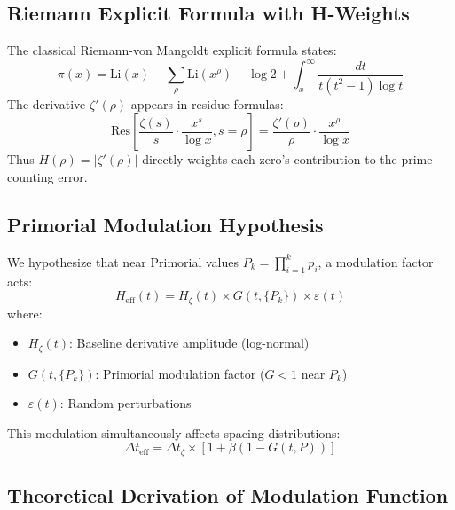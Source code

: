 \documentclass[12pt]{article}
\begin{document}
\subsection{Riemann Explicit Formula with H-Weights}

The classical Riemann-von Mangoldt explicit formula states:
%
\begin{equation}
\pi(x) = \text{Li}(x) - \sum_{\rho} \text{Li}(x^{\rho}) - \log 2 + \int_x^{\infty} \frac{dt}{t(t^2-1)\log t}
\end{equation}
%
The derivative $\zeta'(\rho)$ appears in residue formulas:
%
\begin{equation}
\text{Res}\left[\frac{\zeta(s)}{s} \cdot \frac{x^s}{\log x}, s=\rho\right] = \frac{\zeta'(\rho)}{\rho} \cdot \frac{x^{\rho}}{\log x}
\end{equation}
%
Thus $H(\rho) = |\zeta'(\rho)|$ directly weights each zero's
contribution to the prime counting error.

\subsection{Primorial Modulation Hypothesis}

We hypothesize that near Primorial values $P_k = \prod_{i=1}^k p_i$, a modulation factor acts:
%
\begin{equation}
H_{\text{eff}}(t) = H_{\zeta}(t) \times G(t, \{P_k\}) \times \varepsilon(t)
\end{equation}
%
where:

\begin{itemize}
\item $H_{\zeta}(t)$: Baseline derivative amplitude (log-normal)

\item $G(t, \{P_k\})$: Primorial modulation factor ($G < 1$ near $P_k$)

\item $\varepsilon(t)$: Random perturbations
\end{itemize}

This modulation simultaneously affects spacing distributions:
%
\begin{equation}
\Delta t_{\text{eff}} = \Delta t_{\zeta} \times [1 + \beta(1 - G(t, P))]
\end{equation}

\subsection{Theoretical Derivation of Modulation Function}
\end{document}
